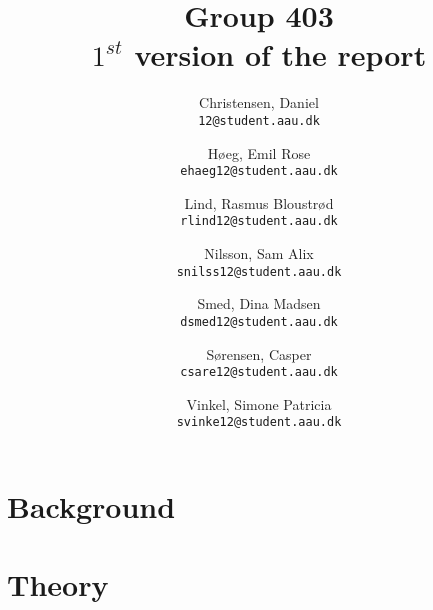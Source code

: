 \documentclass[12pt,a4paper]{report}
\author{
	Christensen, Daniel\\
	\texttt{12@student.aau.dk}
	\and
	Høeg, Emil Rose \\
	\texttt{ehaeg12@student.aau.dk}
	\and
	Lind, Rasmus Bloustrød\\
	\texttt{rlind12@student.aau.dk}
	\and
	Nilsson, Sam Alix \\
	\texttt{snilss12@student.aau.dk}
	\and
	Smed, Dina Madsen\\
	\texttt{dsmed12@student.aau.dk}
	\and
	Sørensen, Casper\\
	\texttt{csare12@student.aau.dk}
	\and
	Vinkel, Simone Patricia \\
	\texttt{svinke12@student.aau.dk}
}
\title{Group 403\\
$1^{st}$ version of the report}
\begin{document}
\maketitle
\tableofcontents
\chapter{Background}



%

\chapter{Theory}







\end{document}
